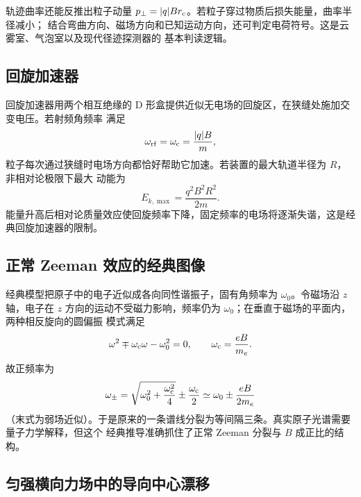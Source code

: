 \gyroHelixDiagram

轨迹曲率还能反推出粒子动量 $p_\perp=|q|Br_{\rm c}$。若粒子穿过物质后损失能量，曲率半径减小；
结合弯曲方向、磁场方向和已知运动方向，还可判定电荷符号。这是云雾室、气泡室以及现代径迹探测器的
基本判读逻辑。

\particleTracksContext

\subsection*{回旋加速器}

回旋加速器用两个相互绝缘的 D 形盒提供近似无电场的回旋区，在狭缝处施加交变电压。若射频角频率
满足
\begin{equation}
  \omega_{\rm rf}=\omega_{\rm c}=\frac{|q|B}{m},
\end{equation}
粒子每次通过狭缝时电场方向都恰好帮助它加速。若装置的最大轨道半径为 $R$，非相对论极限下最大
动能为
\begin{equation}
  \boxed{E_{k,\max}=\frac{q^2B^2R^2}{2m}}.
\end{equation}
能量升高后相对论质量效应使回旋频率下降，固定频率的电场将逐渐失谐，这是经典回旋加速器的限制。

\cyclotronDiagram

\subsection*{正常 Zeeman 效应的经典图像}

经典模型把原子中的电子近似成各向同性谐振子，固有角频率为 $\omega_0$。令磁场沿 $z$ 轴，电子在
$z$ 方向的运动不受磁力影响，频率仍为 $\omega_0$；在垂直于磁场的平面内，两种相反旋向的圆偏振
模式满足
\begin{equation}
  \omega^2\mp\omega_{\rm c}\omega-\omega_0^2=0,
  \qquad \omega_{\rm c}=\frac{eB}{m_e}.
\end{equation}
故正频率为
\begin{equation}
  \omega_\pm=\sqrt{\omega_0^2+\frac{\omega_{\rm c}^2}{4}}
  \pm\frac{\omega_{\rm c}}2
  \simeq \omega_0\pm\frac{eB}{2m_e}
\end{equation}
（末式为弱场近似）。于是原来的一条谱线分裂为等间隔三条。真实原子光谱需要量子力学解释，但这个
经典推导准确抓住了正常 Zeeman 分裂与 $B$ 成正比的结构。

\zeemanSpectrumDiagram

\subsection*{匀强横向力场中的导向中心漂移}

